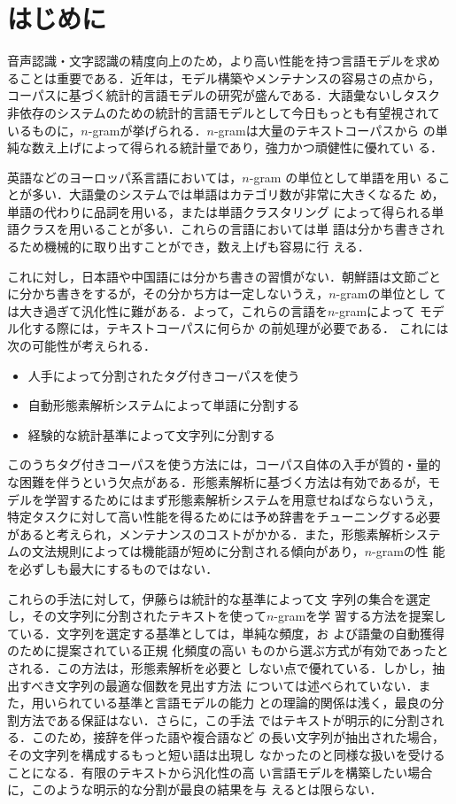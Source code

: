 \section{はじめに}
音声認識・文字認識の精度向上のため，より高い性能を持つ言語モデルを求め
ることは重要である．近年は，モデル構築やメンテナンスの容易さの点から，
コーパスに基づく統計的言語モデルの研究が盛んである．大語彙ないしタスク
非依存のシステムのための統計的言語モデルとして今日もっとも有望視されて
いるものに，$n$-gramが挙げられる．$n$-gramは大量のテキストコーパスから
の単純な数え上げによって得られる統計量であり，強力かつ頑健性に優れてい
る．

英語などのヨーロッパ系言語においては，$n$-gram の単位として単語を用い
ることが多い．大語彙のシステムでは単語はカテゴリ数が非常に大きくなるた
め，単語の代わりに品詞を用いる\cite{nagata94}，または単語クラスタリング
によって得られる単語クラスを用いることが多い．これらの言語においては単
語は分かち書きされるため機械的に取り出すことができ，数え上げも容易に行
える．

これに対し，日本語や中国語には分かち書きの習慣がない．朝鮮語は文節ごと
に分かち書きをするが，その分かち方は一定しないうえ，$n$-gramの単位とし
ては大き過ぎて汎化性に難がある．よって，これらの言語を$n$-gramによって
モデル化する際には，テキストコーパスに何らか\break
の前処理が必要である．
これには次の可能性が考えられる．
\begin{itemize}
\item 人手によって分割されたタグ付きコーパスを使う
\item 自動形態素解析システムによって単語に分割する
\item 経験的な統計基準によって文字列に分割する
\end{itemize}
このうちタグ付きコーパスを使う方法には，コーパス自体の入手が質的・量的
な困難を伴うという欠点がある．形態素解析に基づく方法は有効であるが，モ
デルを学習するためにはまず形態素解析システムを用意せねばならないうえ，
特定タスクに対して高い性能を得るためには予め辞書をチューニングする必要
があると考えられ，メンテナンスのコストがかかる．また，形態素解析システ
ムの文法規則によっては機能語が短めに分割される傾向があり，$n$-gramの性
能を必ずしも最大にするものではない．

これらの手法に対して，伊藤ら\cite{aito96}は統計的な基準によって文
\mbox{字列の集合を選}定し，その文字列に分割されたテキストを使って$n$-gramを学
\mbox{習する方法を提案している．文字}列を選定する基準としては，単純な頻度，お
よび語彙の自動獲得のために提案されている正規\break
化頻度\cite{nakawatase95}の高い
ものから選ぶ方式が\mbox{有効であったとされる．この方法は，形態素解}析を必要と
しない点で優れている．しかし，抽出すべき文字列の最適な個数を見出す方法
については述べられていない．また，用いられている基準と言語モデルの能力
との理論的関係は浅く，最良の分割方法である保証はない．さらに，この手法
ではテキストが明示的に分割される．このため，接辞を伴った語や複合語など
の長い文字列が抽出された場合，その文字列を構成するもっと短い語は出現し
なかったのと同様な扱いを受けることになる．有限のテキストから汎化性の高
い言語モデルを構築したい場合に，このような明示的な分割が最良の結果を与
えるとは限らない．

